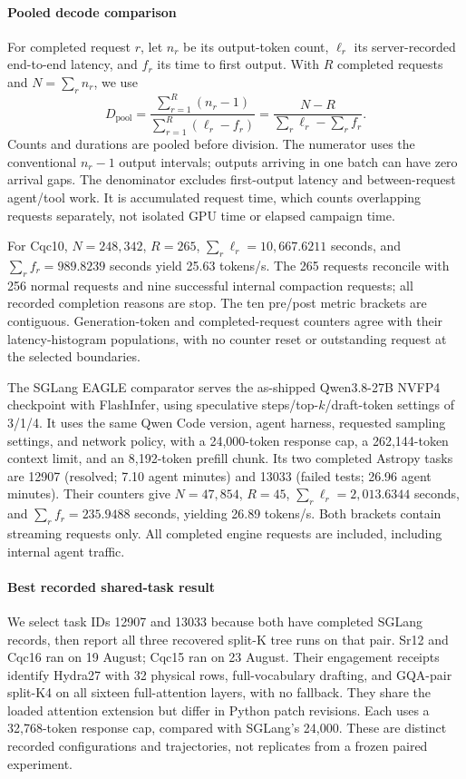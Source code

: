 \paragraph{Pooled decode comparison}
For completed request $r$, let $n_r$ be its output-token count, $\ell_r$ its server-recorded end-to-end latency, and $f_r$ its time to first output. With $R$ completed requests and $N=\sum_r n_r$, we use
\begin{equation}
 D_{\mathrm{pool}} =
 \frac{\sum_{r=1}^{R}(n_r-1)}{\sum_{r=1}^{R}(\ell_r-f_r)}
 = \frac{N-R}{\sum_r\ell_r-\sum_r f_r}.
 \label{eq:pooled-decode}
\end{equation}
Counts and durations are pooled before division. The numerator uses the conventional $n_r-1$ output intervals; outputs arriving in one batch can have zero arrival gaps. The denominator excludes first-output latency and between-request agent/tool work. It is accumulated request time, which counts overlapping requests separately, not isolated GPU time or elapsed campaign time.

For Cqc10, $N=248{,}342$, $R=265$, $\sum_r\ell_r=10{,}667.6211$ seconds, and $\sum_r f_r=989.8239$ seconds yield 25.63 tokens/s. The 265 requests reconcile with 256 normal requests and nine successful internal compaction requests; all recorded completion reasons are stop. The ten pre/post metric brackets are contiguous. Generation-token and completed-request counters agree with their latency-histogram populations, with no counter reset or outstanding request at the selected boundaries.

The SGLang EAGLE comparator serves the as-shipped Qwen3.8-27B NVFP4 checkpoint with FlashInfer, using speculative steps/top-$k$/draft-token settings of 3/1/4. It uses the same Qwen Code version, agent harness, requested sampling settings, and network policy, with a 24,000-token response cap, a 262,144-token context limit, and an 8,192-token prefill chunk. Its two completed Astropy tasks are 12907 (resolved; 7.10 agent minutes) and 13033 (failed tests; 26.96 agent minutes). Their counters give $N=47{,}854$, $R=45$, $\sum_r\ell_r=2{,}013.6344$ seconds, and $\sum_r f_r=235.9488$ seconds, yielding 26.89 tokens/s. Both brackets contain streaming requests only. All completed engine requests are included, including internal agent traffic.

\paragraph{Best recorded shared-task result}
We select task IDs 12907 and 13033 because both have completed SGLang records, then report all three recovered split-K tree runs on that pair. Sr12 and Cqc16 ran on 19 August; Cqc15 ran on 23 August. Their engagement receipts identify Hydra27 with 32 physical rows, full-vocabulary drafting, and GQA-pair split-K4 on all sixteen full-attention layers, with no fallback. They share the loaded attention extension but differ in Python patch revisions. Each uses a 32,768-token response cap, compared with SGLang's 24,000. These are distinct recorded configurations and trajectories, not replicates from a frozen paired experiment.

